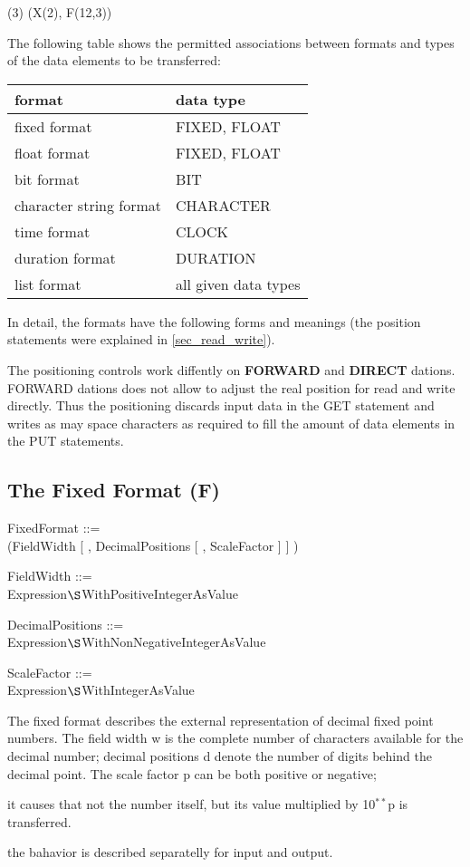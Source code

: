 (3) (X(2), F(12,3))

The following table shows the permitted associations between formats and
types of the data elements to be transferred:

\begin{tabular}{ll}
format                  & data type \\ \hline
fixed format            & FIXED, FLOAT \\
float format            & FIXED, FLOAT \\
bit format              & BIT          \\
character string format & CHARACTER    \\
time format             & CLOCK        \\
duration format         & DURATION     \\
list format             & all given data types
\end{tabular}

In detail, the formats have the following forms and meanings (the
position statements were explained in \ref{sec_read_write}).

\begin{added}
The positioning controls work diffently on {\bf FORWARD} and {\bf DIRECT}
dations. FORWARD dations does not allow to adjust the real position for read
and write directly. 
Thus the positioning discards input data in the GET statement and 
writes as may space characters as required to fill the amount of data elements
in the PUT statements.
\end{added}


\subsection{The Fixed Format (F)}   %
\label{sec_dation_f_format}

FixedFormat ::=\\
 (FieldWidth [ , DecimalPositions [ , ScaleFactor ] ] )

FieldWidth ::=\\
\x Expression$\S $WithPositiveIntegerAsValue

DecimalPositions ::=\\
\x Expression$\S $WithNonNegativeIntegerAsValue

ScaleFactor ::=\\
\x Expression$\S $WithIntegerAsValue

The fixed format describes the external representation of decimal fixed
point numbers. The field width w is the complete number of characters
available for the decimal number; decimal positions d denote the number
of digits behind the decimal point. The scale factor p can be both
positive or negative; 
\begin{removed}
it causes that not the number itself, but its
value multiplied by 10$^{**}$p is transferred.
\end{removed}
\begin{added}
the bahavior is described separatelly for input and output.
\end{added}

